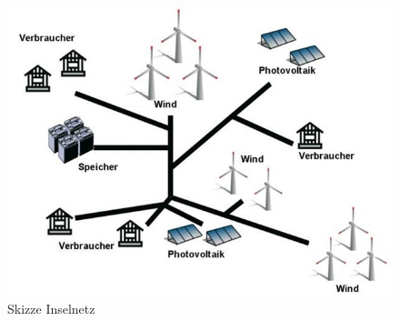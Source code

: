 \begin{figure}[h!]
    \centering
    \includegraphics[width=14cm]{Abbildungen/StandDerTechnikAbb1.jpg}
    \caption{Skizze Inselnetz}\label{fig:Skizze_Inselnetz}
\end{figure}

